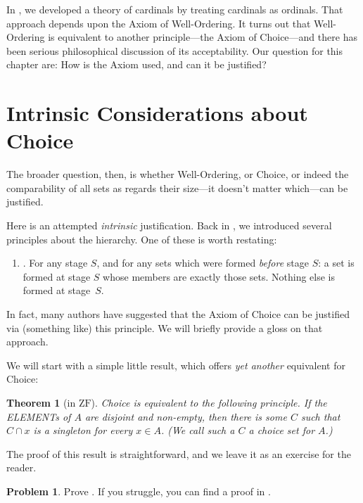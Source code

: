 \documentclass[10pt,a4paper]{article}
\makeatletter
\newcommand*{\olup}[1]{\MakeUppercase{#1}}
\theoremstyle{plain}
\newtheorem{thm}{Theorem}[section]
\theoremstyle{definition}
\newtheorem{prob}{Problem}[section]
\theoremstyle{remark}
\newcommand*{\olfileid}[3]{}
\newcommand*{\olsection}[1]{\section*{#1}}
\newcommand*{\ollabel}[1]{\label{#1}}
\newcommand{\olref}{\@ifnextchar[{\olref@i}{\olref@final}}
\def\olref@i[#1]{\@ifnextchar[{\olref@ii}{\olref@final}}
\def\olref@ii[#1]{\@ifnextchar[{\olref@iii}{\olref@final}}
\def\olref@iii[#1]{\olref@final}
\def\olref@final#1{\ref{#1}}
\providecommand{\ZF}{\mathrm{ZF}}
\makeatother
\begin{document}
In , we
developed a theory of cardinals by treating cardinals as ordinals.
That approach depends upon the Axiom of Well-Ordering. It turns out
that Well-Ordering is equivalent to another principle---the Axiom of
Choice---and there has been serious philosophical discussion of its
acceptability. Our question for this chapter are: How is the Axiom
used, and can it be justified?



\olfileid{sth}{choice}{justifications}
\olsection{Intrinsic Considerations about Choice}

The broader question, then, is whether Well-Ordering, or Choice, or
indeed the comparability of all sets as regards their size---it
doesn't matter which---can be justified. 

Here is an attempted \emph{intrinsic} justification. Back in
\olref[z][story]{sec}, we introduced several principles
about the hierarchy. One of these is worth restating:
\begin{enumerate}
	\item[] \stagesacc. For any stage $S$, and for any sets which were
	formed \emph{before} stage $S$: a set is formed at stage $S$ whose
	members are exactly those sets. Nothing else is formed at
	stage~$S$. 
\end{enumerate}
In fact, many authors have suggested that the Axiom of Choice can be
justified via (something like) this principle. We will briefly provide
a gloss on that approach.

We will start with a simple little result, which offers \emph{yet
another} equivalent for Choice:

\begin{thm}[in $\ZF$]\ollabel{choiceset}
Choice is equivalent to the following principle. If the \olup{element}s
of $A$ are disjoint and non-empty, then there is some $C$ such that $C
\cap x$ is a singleton for every $x \in A$. (We call such a $C$ a
{choice set} for $A$.)
\end{thm}

The proof of this result is straightforward, and we leave it as an
exercise for the reader. 

\begin{prob}
Prove \olref[sth][choice][justifications]{choiceset}. If you struggle,
you can find a proof in \cite[pp.~242--3]{Potter2004}.
\end{prob}
\end{document}
